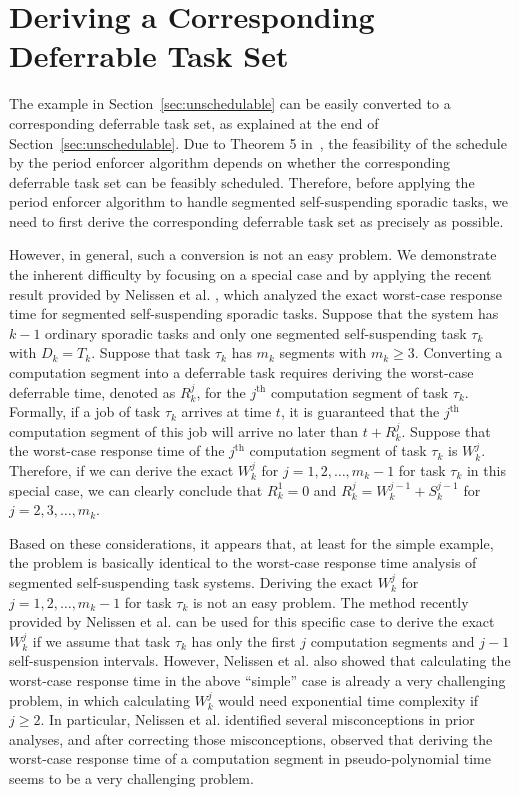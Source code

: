 
\section{Deriving a Corresponding Deferrable Task Set}
\label{sec:convert}

The example in Section~\ref{sec:unschedulable} can be easily converted to a corresponding deferrable task set, as explained at the end of Section~\ref{sec:unschedulable}.  Due to Theorem 5 in~\cite{Raj:suspension1991}, the feasibility of the schedule by the period enforcer algorithm depends on whether the corresponding deferrable task set can be feasibly scheduled. Therefore, before applying the period enforcer algorithm to handle segmented self-suspending sporadic tasks, we need to first derive the corresponding deferrable task set as precisely as possible. 


 However, in general, such a conversion is not an easy problem. We demonstrate the inherent difficulty by focusing on a special case and by applying the recent result provided by Nelissen et al. \cite{ecrts15nelissen}, which analyzed the exact worst-case response time for segmented self-suspending sporadic tasks.
Suppose that the system has $k-1$ ordinary sporadic tasks and only one segmented self-suspending task $\tau_k$ with $D_k = T_k$.  Suppose that task $\tau_k$ has $m_k$ segments with $m_k \geq 3$.  Converting a computation segment into a deferrable task requires deriving the worst-case deferrable time, denoted as $R_k^j$, for the $j^{\mathrm{th}}$ computation segment of task $\tau_k$. Formally, if a job of task $\tau_k$ arrives at time $t$, it is guaranteed that the $j^{\mathrm{th}}$ computation segment of this job will arrive no later than $t+R_k^j$. Suppose that the worst-case response time of the $j^{\mathrm{th}}$ computation segment of task $\tau_k$ is $W_k^j$. Therefore,  if we can derive the exact $W_k^j$ for $j=1,2,\ldots,m_k-1$ for task $\tau_k$ in this special case, we can clearly conclude that $R_k^1=0$ and $R_k^j = W_k^{j-1}+S_k^{j-1}$ for $j=2,3,\ldots,m_k$.


Based on these considerations, it appears that, at least for the simple example, the problem is basically identical to the worst-case response time analysis of segmented self-suspending task systems. Deriving the exact $W_k^j$ for $j=1,2,\ldots,m_k-1$ for task $\tau_k$ is not an easy problem.  The method recently provided by Nelissen et al. \cite{ecrts15nelissen} can be used for this specific case to derive the exact $W_k^j$ if we assume that task $\tau_k$ has only the first $j$ computation segments and $j-1$ self-suspension intervals.  However, Nelissen et al. \cite{ecrts15nelissen} also showed that calculating the worst-case response time in the above ``simple'' case is already a very challenging problem, in which calculating $W_k^j$ would need exponential time complexity if $j \geq 2$.
In particular, Nelissen et al. \cite{ecrts15nelissen} identified several misconceptions in prior analyses, and after correcting those misconceptions, observed that deriving the worst-case response time of a computation segment in pseudo-polynomial time seems to be a very challenging problem. 

